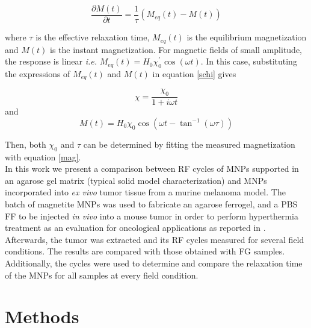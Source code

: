\documentclass[preprint,12pt]{elsarticle}
\begin{document}
\begin{equation}
    \frac{\partial M(t)}{\partial t}=\frac{1}{\tau}(M_{eq}(t)-M(t))
    \label{schi}
\end{equation}

where  $\tau$ is the effective relaxation time, $M_{eq}(t)$ is the equilibrium magnetization and $M(t)$ is the instant magnetization. For magnetic fields of small amplitude, the response is linear \textit{i.e.} $M_{eq}(t)=H_0 \chi_0^{'} \cos(\omega t)$. In this case,  substituting the expressions of $M_{eq}(t)$ and $M(t)$ in equation \ref{schi} gives 

\begin{equation}
\chi=\frac{\chi_0}{1+i\omega t}    
\end{equation}
and
\begin{equation}
   M(t) = H_0\chi_0 \cos (\omega t-\tan^{-1}(\omega \tau)) 
   \label{mag}
\end{equation}


Then,  both $\chi_0$ and $\tau$ can be determined by fitting the measured magnetization with equation \ref{mag}.\\

In this work we present a comparison between RF cycles of MNPs supported in an agarose gel matrix (typical solid model characterization) and MNPs incorporated into \textit{ex vivo} tumor tissue from a murine melanoma model. The batch  of magnetite MNPs was used to fabricate an agarose ferrogel, and a PBS  FF to be injected \textit{in vivo} into a mouse tumor in order to perform hyperthermia treatment as an evaluation for oncological applications as reported in \cite{coral2018nanoclusters}. Afterwards, the tumor was extracted and its RF cycles measured for several field conditions. The results are compared with those obtained with FG samples.
Additionally, the cycles were used to determine and compare the relaxation time of the MNPs for all samples at every field condition. 

\section{Methods}
\end{document}
